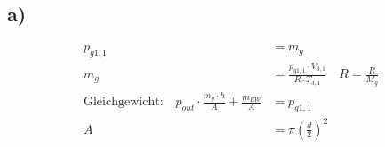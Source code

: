 

\subsection*{a)}
\begin{align*}
    p_{g1,1} &= m_g \\
    m_g &= \frac{p_{g1,1} \cdot V_{3,1}}{R \cdot T_{3,1}} \quad R = \frac{\bar{R}}{M_g} \\
    \text{Gleichgewicht:} \quad p_{out} \cdot \frac{m_g \cdot h}{A} + \frac{m_{EW}}{A} &= p_{g1,1} \\
    A &= \pi \left( \frac{d}{2} \right)^2
\end{align*}